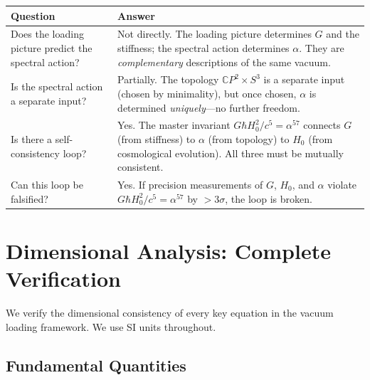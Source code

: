 \documentclass[11pt]{article}
\begin{document}
\begin{center}
\begin{tabular}{lp{8cm}}
\toprule
\textbf{Question} & \textbf{Answer} \\
\midrule
Does the loading picture predict the spectral action? &
Not directly.  The loading picture determines $G$ and the stiffness;
the spectral action determines $\alpha$.  They are \emph{complementary}
descriptions of the same vacuum. \\
\addlinespace
Is the spectral action a separate input? &
Partially.  The topology $\mathbb{C}P^2\times S^3$ is a separate input
(chosen by minimality), but once chosen, $\alpha$ is determined
\emph{uniquely}---no further freedom. \\
\addlinespace
Is there a self-consistency loop? &
Yes.  The master invariant $G\hbar H_0^2/c^5 = \alpha^{57}$ connects
$G$ (from stiffness) to $\alpha$ (from topology) to $H_0$ (from cosmological
evolution).  All three must be mutually consistent. \\
\addlinespace
Can this loop be falsified? &
Yes.  If precision measurements of $G$, $H_0$, and $\alpha$ violate
$G\hbar H_0^2/c^5 = \alpha^{57}$ by $> 3\sigma$, the loop is broken. \\
\bottomrule
\end{tabular}
\end{center}

\section{Dimensional Analysis: Complete Verification}
\label{sec:dimensions}

We verify the dimensional consistency of every key equation in the
vacuum loading framework.  We use SI units throughout.

\subsection{Fundamental Quantities}
\end{document}
